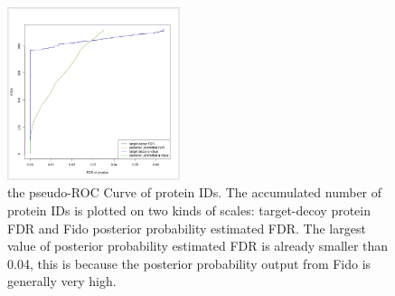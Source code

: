 \begin{figure}[htbp]
  \centering
  \includegraphics[width=0.45\textwidth]{graphics/protein_inference/proteinFDR.png}
  \caption{the pseudo-ROC Curve of protein IDs. The accumulated number of protein IDs is plotted on two kinds of scales: target-decoy protein FDR and Fido posterior probability estimated FDR. The largest value of posterior probability estimated FDR is already smaller than 0.04, this is because the posterior probability output from Fido is generally very high.}
  \label{fig:proteinfdr}
\end{figure}
